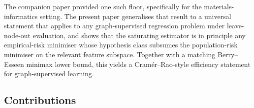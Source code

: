 \documentclass[11pt,a4paper]{article}
\theoremstyle{plain}
\theoremstyle{definition}
\theoremstyle{remark}
\begin{document}
The companion paper \citet{FossePallares2026applicabilityBound} provided one
such floor, specifically for the materials-informatics setting.  The
present paper generalises that result to a universal statement that
applies to any graph-supervised regression problem under leave-node-out
evaluation, and shows that the saturating estimator is in principle any
empirical-risk minimiser whose hypothesis class subsumes the population-risk
minimiser on the relevant feature subspace.  Together with a matching
Berry--Esseen minimax lower bound, this yields a Cram\'er--Rao-style
efficiency statement for graph-supervised learning.

\subsection{Contributions}
\end{document}
